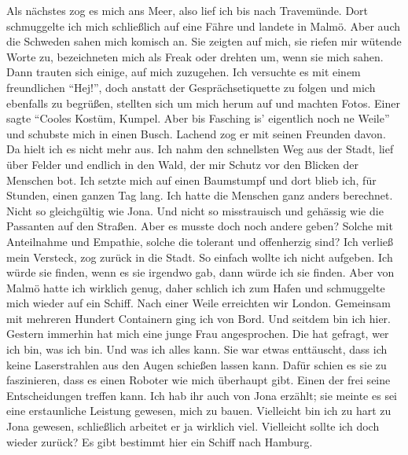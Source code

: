 Als nächstes zog es mich ans Meer, also lief ich bis nach Travemünde. Dort schmuggelte ich mich schließlich auf eine Fähre und landete in Malmö. Aber auch die Schweden sahen mich komisch an. Sie zeigten auf mich, sie riefen mir wütende Worte zu, bezeichneten mich als Freak oder drehten um, wenn sie mich sahen. Dann trauten sich einige, auf mich zuzugehen. Ich versuchte es mit einem freundlichen "`Hej!"', doch anstatt der Gesprächsetiquette zu folgen und mich ebenfalls zu begrüßen, stellten sich um mich herum auf und machten Fotos. Einer sagte "`Cooles Kostüm, Kumpel. Aber bis Fasching is' eigentlich noch ne Weile"' und schubste mich in einen Busch. Lachend zog er mit seinen Freunden davon. Da hielt ich es nicht mehr aus. Ich nahm den schnellsten Weg aus der Stadt, lief über Felder und endlich in den Wald, der mir Schutz vor den Blicken der Menschen bot. Ich setzte mich auf einen Baumstumpf und dort blieb ich, für Stunden, einen ganzen Tag lang. Ich hatte die Menschen ganz anders berechnet. Nicht so gleichgültig wie Jona. Und nicht so misstrauisch und gehässig wie die Passanten auf den Straßen. Aber es musste doch noch andere geben? Solche mit Anteilnahme und Empathie, solche die tolerant und offenherzig sind? Ich verließ mein Versteck, zog zurück in die Stadt. So einfach wollte ich nicht aufgeben. Ich würde sie finden, wenn es sie irgendwo gab, dann würde ich sie finden. Aber von Malmö hatte ich wirklich genug, daher schlich ich zum Hafen und schmuggelte mich wieder auf ein Schiff. Nach einer Weile erreichten wir London. Gemeinsam mit mehreren Hundert Containern ging ich von Bord.
Und seitdem bin ich hier. Gestern immerhin hat mich eine junge Frau angesprochen. Die hat gefragt, wer ich bin, was ich bin. Und was ich alles kann. Sie war etwas enttäuscht, dass ich keine Laserstrahlen aus den Augen schießen lassen kann. Dafür schien es sie zu faszinieren, dass es einen Roboter wie mich überhaupt gibt. Einen der frei seine Entscheidungen treffen kann. Ich hab ihr auch von Jona erzählt; sie meinte es sei eine erstaunliche Leistung gewesen, mich zu bauen. Vielleicht bin ich zu hart zu Jona gewesen, schließlich arbeitet er ja wirklich viel. Vielleicht sollte ich doch wieder zurück? Es gibt bestimmt hier ein Schiff nach Hamburg.

